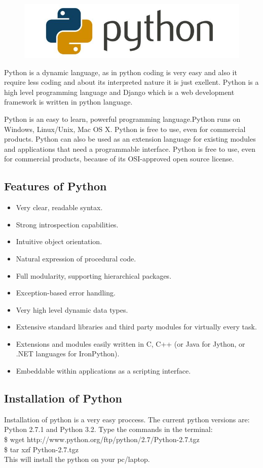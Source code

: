 \begin{figure}[h]
\centering \includegraphics[scale=0.3]{images/python.jpg}
\end{figure}
\noindent Python is a dynamic language, as in python coding is very easy and 
also it require less coding and about its interpreted nature it is 
just exellent. Python is a high level programming language and Django 
which is a web development framework is written in python language.

Python is an easy to learn, powerful programming language.Python runs 
on Windows, Linux/Unix, Mac OS X. Python is free to use, even for 
commercial products. Python can also be used as an extension language 
for existing modules and applications that need a programmable interface.  
Python is free to use, even for commercial products, because of its 
OSI-approved open source license.
\subsection{Features of Python}
\begin{itemize}
\item Very clear, readable syntax.
\item Strong introspection capabilities.
\item Intuitive object orientation.
\item Natural expression of procedural code.
\item Full modularity, supporting hierarchical packages.
\item Exception-based error handling.
\item Very high level dynamic data types.
\item Extensive standard libraries and third party modules for virtually every task.
\item Extensions and modules easily written in C, C++ (or Java for Jython, or .NET languages for IronPython).
\item Embeddable within applications as a scripting interface.
\end{itemize}
\subsection{Installation of Python}
Installation of python is a very easy proccess.
The current python versions are: Python 2.7.1 and Python 3.2.
Type the commands in the terminal:\\

 \$ wget http://www.python.org/ftp/python/2.7/Python-2.7.tgz\\

 
 \$ tar xzf Python-2.7.tgz\\


This will install the python on your pc/laptop.

